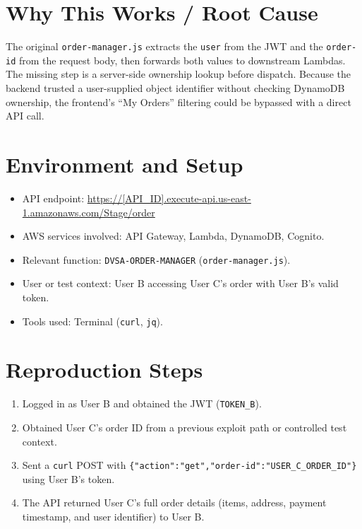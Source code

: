 \documentclass[12pt]{report}
\begin{document}
\section{Why This Works / Root Cause}
The original \texttt{order-manager.js} extracts the \texttt{user} from the JWT and the \texttt{order-id} from the request body, then forwards both values to downstream Lambdas. The missing step is a server-side ownership lookup before dispatch. Because the backend trusted a user-supplied object identifier without checking DynamoDB ownership, the frontend's ``My Orders'' filtering could be bypassed with a direct API call.

\section{Environment and Setup}
\begin{itemize}
  \item API endpoint: \url{https://[API_ID].execute-api.us-east-1.amazonaws.com/Stage/order}
  \item AWS services involved: API Gateway, Lambda, DynamoDB, Cognito.
  \item Relevant function: \texttt{DVSA-ORDER-MANAGER} (\texttt{order-manager.js}).
  \item User or test context: User B accessing User C's order with User B's valid token.
  \item Tools used: Terminal (\texttt{curl}, \texttt{jq}).
\end{itemize}

\section{Reproduction Steps}
\begin{enumerate}
  \item Logged in as User B and obtained the JWT (\texttt{TOKEN\_B}).
  \item Obtained User C's order ID from a previous exploit path or controlled test context.
  \item Sent a \texttt{curl} POST with \texttt{\{"action":"get","order-id":"USER\_C\_ORDER\_ID"\}} using User B's token.
  \item The API returned User C's full order details (items, address, payment timestamp, and user identifier) to User B.
\end{enumerate}
\end{document}
